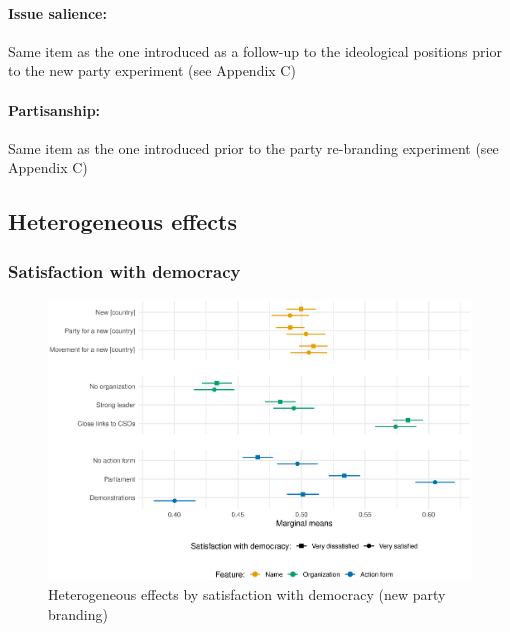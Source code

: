 \documentclass[12pt]{article}
\begin{document}
\paragraph{Issue salience:} Same item as the one introduced as a follow-up to the ideological positions prior to the new party experiment (see Appendix C)

\paragraph{Partisanship:} Same item as the one introduced prior to the party re-branding experiment (see Appendix C)

\newpage

\subsection{Heterogeneous effects}

\subsubsection{Satisfaction with democracy}

\begin{figure}[H]
\includegraphics[width=\textwidth]{./Figures/CJ1_heteff_satdem_tradeoff.eps}
\caption{Heterogeneous effects by satisfaction with democracy (new party branding)}
\end{figure}
\end{document}
